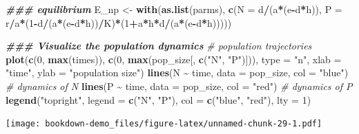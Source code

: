 \documentclass[
]{book}
\newenvironment{Shaded}{\begin{snugshade}}{\end{snugshade}}
\newcommand{\AttributeTok}[1]{\textcolor[rgb]{0.13,0.29,0.53}{#1}}
\newcommand{\CommentTok}[1]{\textcolor[rgb]{0.56,0.35,0.01}{\textit{#1}}}
\newcommand{\DecValTok}[1]{\textcolor[rgb]{0.00,0.00,0.81}{#1}}
\newcommand{\DocumentationTok}[1]{\textcolor[rgb]{0.56,0.35,0.01}{\textbf{\textit{#1}}}}
\newcommand{\FunctionTok}[1]{\textcolor[rgb]{0.13,0.29,0.53}{\textbf{#1}}}
\newcommand{\NormalTok}[1]{#1}
\newcommand{\OtherTok}[1]{\textcolor[rgb]{0.56,0.35,0.01}{#1}}
\newcommand{\SpecialCharTok}[1]{\textcolor[rgb]{0.81,0.36,0.00}{\textbf{#1}}}
\newcommand{\StringTok}[1]{\textcolor[rgb]{0.31,0.60,0.02}{#1}}
\begin{document}
\begin{Shaded}
\begin{Highlighting}[]
\DocumentationTok{\#\#\# equilibrium}
\NormalTok{E\_np }\OtherTok{\textless{}{-}} \FunctionTok{with}\NormalTok{(}\FunctionTok{as.list}\NormalTok{(parms), }
             \FunctionTok{c}\NormalTok{(}\AttributeTok{N =}\NormalTok{ d}\SpecialCharTok{/}\NormalTok{(a}\SpecialCharTok{*}\NormalTok{(e}\SpecialCharTok{{-}}\NormalTok{d}\SpecialCharTok{*}\NormalTok{h)),}
               \AttributeTok{P =}\NormalTok{ r}\SpecialCharTok{/}\NormalTok{a}\SpecialCharTok{*}\NormalTok{(}\DecValTok{1}\SpecialCharTok{{-}}\NormalTok{d}\SpecialCharTok{/}\NormalTok{(a}\SpecialCharTok{*}\NormalTok{(e}\SpecialCharTok{{-}}\NormalTok{d}\SpecialCharTok{*}\NormalTok{h))}\SpecialCharTok{/}\NormalTok{K)}\SpecialCharTok{*}\NormalTok{(}\DecValTok{1}\SpecialCharTok{+}\NormalTok{a}\SpecialCharTok{*}\NormalTok{h}\SpecialCharTok{*}\NormalTok{d}\SpecialCharTok{/}\NormalTok{(a}\SpecialCharTok{*}\NormalTok{(e}\SpecialCharTok{{-}}\NormalTok{d}\SpecialCharTok{*}\NormalTok{h)))))}


\DocumentationTok{\#\#\# Visualize the population dynamics}
\CommentTok{\# population trajectories}
\FunctionTok{plot}\NormalTok{(}\FunctionTok{c}\NormalTok{(}\DecValTok{0}\NormalTok{, }\FunctionTok{max}\NormalTok{(times)), }\FunctionTok{c}\NormalTok{(}\DecValTok{0}\NormalTok{, }\FunctionTok{max}\NormalTok{(pop\_size[, }\FunctionTok{c}\NormalTok{(}\StringTok{"N"}\NormalTok{, }\StringTok{"P"}\NormalTok{)])), }\AttributeTok{type =} \StringTok{"n"}\NormalTok{, }\AttributeTok{xlab =} \StringTok{"time"}\NormalTok{, }\AttributeTok{ylab =} \StringTok{"population size"}\NormalTok{)}
\FunctionTok{lines}\NormalTok{(N }\SpecialCharTok{\textasciitilde{}}\NormalTok{ time, }\AttributeTok{data =}\NormalTok{ pop\_size, }\AttributeTok{col =} \StringTok{"blue"}\NormalTok{) }\CommentTok{\# dynamics of N}
\FunctionTok{lines}\NormalTok{(P }\SpecialCharTok{\textasciitilde{}}\NormalTok{ time, }\AttributeTok{data =}\NormalTok{ pop\_size, }\AttributeTok{col =} \StringTok{"red"}\NormalTok{) }\CommentTok{\# dynamics of P}
\FunctionTok{legend}\NormalTok{(}\StringTok{"topright"}\NormalTok{, }\AttributeTok{legend =} \FunctionTok{c}\NormalTok{(}\StringTok{"N"}\NormalTok{, }\StringTok{"P"}\NormalTok{), }\AttributeTok{col =} \FunctionTok{c}\NormalTok{(}\StringTok{"blue"}\NormalTok{, }\StringTok{"red"}\NormalTok{), }\AttributeTok{lty =} \DecValTok{1}\NormalTok{)}
\end{Highlighting}
\end{Shaded}

\texttt{[image: bookdown-demo\_files/figure-latex/unnamed-chunk-29-1.pdf]}
\end{document}
